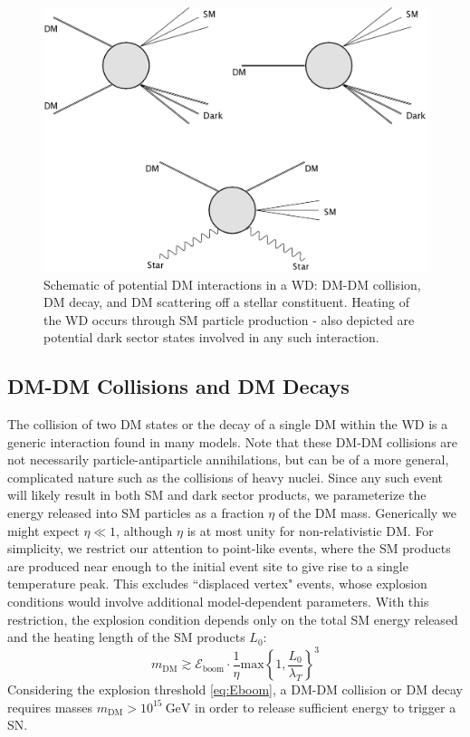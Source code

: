 \documentclass[twocolumn,showpacs,preprintnumbers,amsmath,amssymb,prd]{revtex4}
\newcommand{\GeV}{\text{GeV}}
\begin{document}
\begin{figure}
\includegraphics[scale=0.09]{feynmandiag.jpg}
\caption{Schematic of potential DM interactions in a WD: DM-DM collision, DM decay, and DM scattering off a stellar constituent. Heating of the WD occurs through SM particle production - also depicted are potential dark sector states involved in any such interaction.}
\label{fig:feynman}
\end{figure}

\subsection{DM-DM Collisions and DM Decays}
\label{sec:coldecay}
The collision of two DM states or the decay of a single DM within the WD is a generic interaction found in many models.  Note that these DM-DM collisions are not necessarily particle-antiparticle annihilations, but can be of a more general, complicated nature such as the collisions of heavy nuclei. Since any such event will likely result in both SM and dark sector products, we parameterize the energy released into SM particles as a fraction $\eta$ of the DM mass. Generically we might expect $\eta \ll 1$, although $\eta$ is at most unity for non-relativistic DM. For simplicity, we restrict our attention to point-like events, where the SM products are produced near enough to the initial event site to give rise to a single temperature peak.  This excludes ``displaced vertex" events, whose explosion conditions would involve additional model-dependent parameters. With this restriction, the explosion condition depends only on the total SM energy released and the heating length of the SM products $L_0$:
\begin{equation}
\label{eq:coldecay}
    m_\text{DM} \gtrsim \mathcal{E}_\text{boom} \cdot \frac{1}{\eta}
      \text{max}\left\{1, \frac{L_0}{\lambda_T}\right\}^3
\end{equation}
Considering the explosion threshold \eqref{eq:Eboom}, a DM-DM collision or DM decay requires masses $m_\text{DM} > 10^{15} ~\GeV$ in order to release sufficient energy to trigger a SN. 
\end{document}
